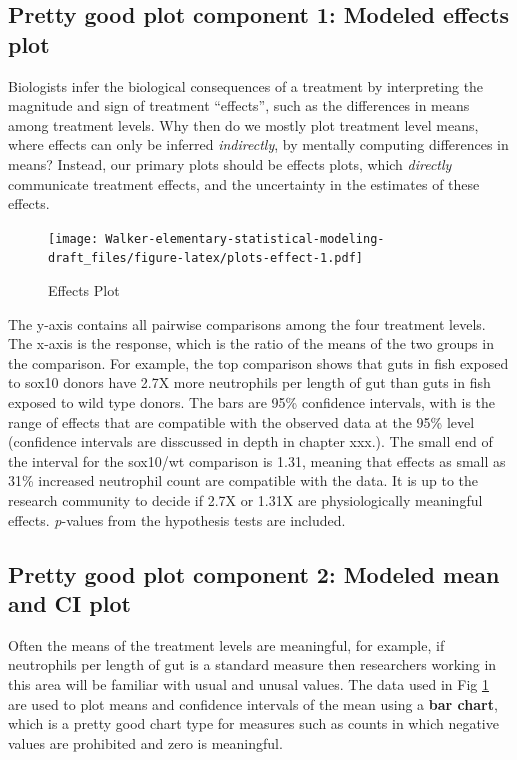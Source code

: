 \documentclass[]{book}
\begin{document}
\hypertarget{pretty-good-plot-component-1-modeled-effects-plot}{%
\subsection{Pretty good plot component 1: Modeled effects plot}\label{pretty-good-plot-component-1-modeled-effects-plot}}

Biologists infer the biological consequences of a treatment by interpreting the magnitude and sign of treatment ``effects'', such as the differences in means among treatment levels. Why then do we mostly plot treatment level means, where effects can only be inferred \emph{indirectly}, by mentally computing differences in means? Instead, our primary plots should be effects plots, which \emph{directly} communicate treatment effects, and the uncertainty in the estimates of these effects.

\begin{figure}
\centering
\texttt{[image: Walker-elementary-statistical-modeling-draft\_files/figure-latex/plots-effect-1.pdf]}
\caption{\label{fig:plots-effect}Effects Plot}
\end{figure}

The y-axis contains all pairwise comparisons among the four treatment levels. The x-axis is the response, which is the ratio of the means of the two groups in the comparison. For example, the top comparison shows that guts in fish exposed to sox10 donors have 2.7X more neutrophils per length of gut than guts in fish exposed to wild type donors. The bars are 95\% confidence intervals, with is the range of effects that are compatible with the observed data at the 95\% level (confidence intervals are disscussed in depth in chapter xxx.). The small end of the interval for the sox10/wt comparison is 1.31, meaning that effects as small as 31\% increased neutrophil count are compatible with the data. It is up to the research community to decide if 2.7X or 1.31X are physiologically meaningful effects. \emph{p}-values from the hypothesis tests are included.

\hypertarget{pretty-good-plot-component-2-modeled-mean-and-ci-plot}{%
\subsection{Pretty good plot component 2: Modeled mean and CI plot}\label{pretty-good-plot-component-2-modeled-mean-and-ci-plot}}

Often the means of the treatment levels are meaningful, for example, if neutrophils per length of gut is a standard measure then researchers working in this area will be familiar with usual and unusal values. The data used in Fig \ref{fig:plots-effect} are used to plot means and confidence intervals of the mean using a \textbf{bar chart}, which is a pretty good chart type for measures such as counts in which negative values are prohibited and zero is meaningful.
\end{document}
